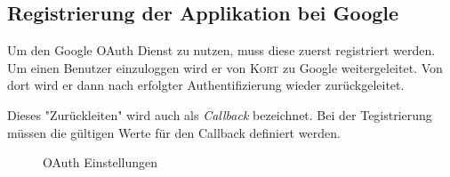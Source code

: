 
\subsection{Registrierung der Applikation bei Google}
Um den Google OAuth Dienst zu nutzen, muss diese zuerst registriert werden.
Um einen Benutzer einzuloggen wird er von \textsc{Kort} zu Google weitergeleitet.
Von dort wird er dann nach erfolgter Authentifizierung wieder zurückgeleitet.

Dieses "Zurückleiten" wird auch als \emph{Callback} bezeichnet.
Bei der Tegistrierung müssen die gültigen Werte für den Callback definiert werden.

\begin{figure}[H]
\caption{OAuth Einstellungen}
\end{figure}